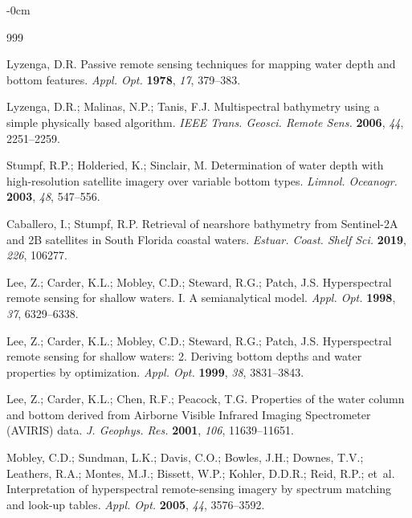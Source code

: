 \documentclass[remotesensing,article,submit,pdftex]{Definitions/mdpi}
\begin{document}
\begin{adjustwidth}{-\extralength}{0cm}


\begin{thebibliography}{999}

Lyzenga, D.R. Passive remote sensing techniques for mapping water depth and bottom features. {\em Appl. Opt.} {\bf 1978}, {\em 17}, 379--383.

Lyzenga, D.R.; Malinas, N.P.; Tanis, F.J. Multispectral bathymetry using a simple physically based algorithm. {\em IEEE Trans. Geosci. Remote Sens.} {\bf 2006}, {\em 44}, 2251--2259.

Stumpf, R.P.; Holderied, K.; Sinclair, M. Determination of water depth with high-resolution satellite imagery over variable bottom types. {\em Limnol. Oceanogr.} {\bf 2003}, {\em 48}, 547--556.

Caballero, I.; Stumpf, R.P. Retrieval of nearshore bathymetry from Sentinel-2A and 2B satellites in South Florida coastal waters. {\em Estuar. Coast. Shelf Sci.} {\bf 2019}, {\em 226}, 106277.

Lee, Z.; Carder, K.L.; Mobley, C.D.; Steward, R.G.; Patch, J.S. Hyperspectral remote sensing for shallow waters. I. A semianalytical model. {\em Appl. Opt.} {\bf 1998}, {\em 37}, 6329--6338.

Lee, Z.; Carder, K.L.; Mobley, C.D.; Steward, R.G.; Patch, J.S. Hyperspectral remote sensing for shallow waters: 2. Deriving bottom depths and water properties by optimization. {\em Appl. Opt.} {\bf 1999}, {\em 38}, 3831--3843.

Lee, Z.; Carder, K.L.; Chen, R.F.; Peacock, T.G. Properties of the water column and bottom derived from Airborne Visible Infrared Imaging Spectrometer (AVIRIS) data. {\em J. Geophys. Res.} {\bf 2001}, {\em 106}, 11639--11651.

Mobley, C.D.; Sundman, L.K.; Davis, C.O.; Bowles, J.H.; Downes, T.V.; Leathers, R.A.; Montes, M.J.; Bissett, W.P.; Kohler, D.D.R.; Reid, R.P.; et~al. Interpretation of hyperspectral remote-sensing imagery by spectrum matching and look-up tables. {\em Appl. Opt.} {\bf 2005}, {\em 44}, 3576--3592.


\end{thebibliography}
\end{adjustwidth}
\end{document}
